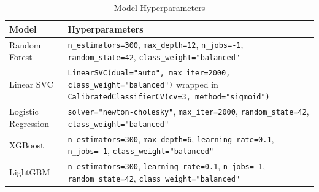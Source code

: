 \documentclass[conference]{IEEEtran}
\begin{document}
\begin{table}[htbp]
\caption{Model Evaluation Results (5-fold Mean, Full 455,006-row Dataset)}
\label{tab:model_results}
\centering
\scriptsize
\setlength{\tabcolsep}{3pt}
\renewcommand{\arraystretch}{1.15}
\end{table}

\begin{table}[!t]
\caption{Model Hyperparameters}
\label{tab:hyperparams}
\centering
\scriptsize
\setlength{\tabcolsep}{3pt}
\renewcommand{\arraystretch}{1.15}
\begin{tabular}{|l|p{6.0cm}|}
\hline
\textbf{Model} & \textbf{Hyperparameters} \\
\hline
Random Forest       & \texttt{n\_estimators=300}, \texttt{max\_depth=12}, \texttt{n\_jobs=-1}, \texttt{random\_state=42}, \texttt{class\_weight="balanced"} \\
\hline
Linear SVC          & \texttt{LinearSVC(dual="auto", max\_iter=2000, class\_weight="balanced")} wrapped in \texttt{CalibratedClassifierCV(cv=3, method="sigmoid")} \\
\hline
Logistic Regression & \texttt{solver="newton-cholesky"}, \texttt{max\_iter=2000}, \texttt{random\_state=42}, \texttt{class\_weight="balanced"} \\
\hline
XGBoost             & \texttt{n\_estimators=300}, \texttt{max\_depth=6}, \texttt{learning\_rate=0.1}, \texttt{n\_jobs=-1}, \texttt{class\_weight="balanced"} \\
\hline
LightGBM            & \texttt{n\_estimators=300}, \texttt{learning\_rate=0.1}, \texttt{n\_jobs=-1}, \texttt{random\_state=42}, \texttt{class\_weight="balanced"} \\
\hline
\end{tabular}
\end{table}
\end{document}
